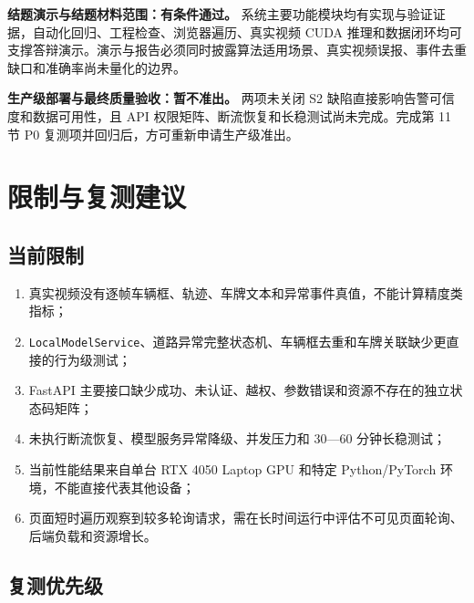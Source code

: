 \textbf{结题演示与结题材料范围：有条件通过。} 系统主要功能模块均有实现与验证证据，自动化回归、工程检查、浏览器遍历、真实视频 CUDA 推理和数据闭环均可支撑答辩演示。演示与报告必须同时披露算法适用场景、真实视频误报、事件去重缺口和准确率尚未量化的边界。

\textbf{生产级部署与最终质量验收：暂不准出。} 两项未关闭 S2 缺陷直接影响告警可信度和数据可用性，且 API 权限矩阵、断流恢复和长稳测试尚未完成。完成第 11 节 P0 复测项并回归后，方可重新申请生产级准出。

\section{限制与复测建议}\label{test-ux9650ux5236ux4e0eux590dux6d4bux5efaux8bae}

\subsection{当前限制}\label{test-ux5f53ux524dux9650ux5236}

\begin{enumerate}
\def\labelenumi{\arabic{enumi}.}
\tightlist
\item
  真实视频没有逐帧车辆框、轨迹、车牌文本和异常事件真值，不能计算精度类指标；
\item
  \texttt{Local\allowbreak{}Model\allowbreak{}Service}、道路异常完整状态机、车辆框去重和车牌关联缺少更直接的行为级测试；
\item
  FastAPI 主要接口缺少成功、未认证、越权、参数错误和资源不存在的独立状态码矩阵；
\item
  未执行断流恢复、模型服务异常降级、并发压力和 30---60 分钟长稳测试；
\item
  当前性能结果来自单台 RTX 4050 Laptop GPU 和特定 Python/PyTorch 环境，不能直接代表其他设备；
\item
  页面短时遍历观察到较多轮询请求，需在长时间运行中评估不可见页面轮询、后端负载和资源增长。
\end{enumerate}

\subsection{复测优先级}\label{test-ux590dux6d4bux4f18ux5148ux7ea7}

